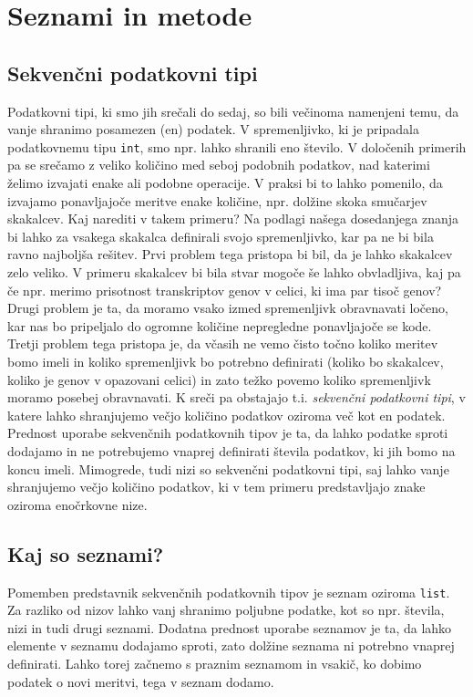 \chapter{Seznami in metode}

\section{Sekvenčni podatkovni tipi}

Podatkovni tipi, ki smo jih srečali do sedaj, so bili večinoma namenjeni temu, da vanje shranimo posamezen (en) podatek. V spremenljivko, ki je pripadala podatkovnemu tipu \texttt{int}, smo npr. lahko shranili eno število. V določenih primerih pa se srečamo z veliko količino med seboj podobnih podatkov, nad katerimi želimo izvajati enake ali podobne operacije. V praksi bi to lahko pomenilo, da izvajamo ponavljajoče meritve enake količine, npr. dolžine skoka smučarjev skakalcev. Kaj narediti v takem primeru? Na podlagi našega dosedanjega znanja bi lahko za vsakega skakalca definirali svojo spremenljivko, kar pa ne bi bila ravno najboljša rešitev. Prvi problem tega pristopa bi bil, da je lahko skakalcev zelo veliko. V primeru skakalcev bi bila stvar mogoče še lahko obvladljiva, kaj pa če npr. merimo prisotnost transkriptov genov v celici, ki ima par tisoč genov? Drugi problem je ta, da moramo vsako izmed spremenljivk obravnavati ločeno, kar nas bo pripeljalo do ogromne količine nepregledne ponavljajoče se kode. Tretji problem tega pristopa je, da včasih ne vemo čisto točno koliko meritev bomo imeli in koliko spremenljivk bo potrebno definirati (koliko bo skakalcev, koliko je genov v opazovani celici) in zato težko povemo koliko spremenljivk moramo posebej obravnavati. K sreči pa obstajajo t.i. \emph{sekvenčni podatkovni tipi}, v katere lahko shranjujemo večjo količino podatkov oziroma več kot en podatek. Prednost uporabe sekvenčnih podatkovnih tipov je ta, da lahko podatke sproti dodajamo in ne potrebujemo vnaprej definirati števila podatkov, ki jih bomo na koncu imeli. Mimogrede, tudi nizi so sekvenčni podatkovni tipi, saj lahko vanje shranjujemo večjo količino podatkov, ki v tem primeru predstavljajo znake oziroma enočrkovne nize. 

\section{Kaj so seznami?}

Pomemben predstavnik sekvenčnih podatkovnih tipov je seznam oziroma \texttt{list}. Za razliko od nizov lahko vanj shranimo poljubne podatke, kot so npr. števila, nizi in tudi drugi seznami. Dodatna prednost uporabe seznamov je ta, da lahko elemente v seznamu dodajamo sproti, zato dolžine seznama ni potrebno vnaprej definirati. Lahko torej začnemo s praznim seznamom in vsakič, ko dobimo podatek o novi meritvi, tega v seznam dodamo. 

